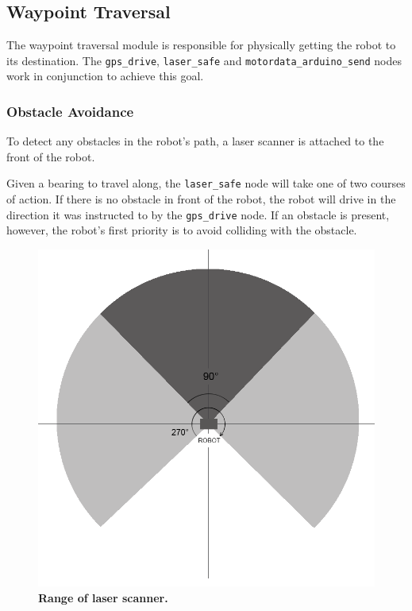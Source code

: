 \documentclass[titlepage,12pt,a4paper]{article}
\begin{document}
\pagebreak

\subsection{Waypoint Traversal}
The waypoint traversal module is responsible for physically getting the robot to its destination. The \verb|gps_drive|, \verb|laser_safe| and \verb|motordata_arduino_send| nodes work in conjunction to achieve this goal.

\subsubsection{Obstacle Avoidance}
To detect any obstacles in the robot's path, a laser scanner is attached to the front of the robot.

Given a bearing to travel along, the \verb|laser_safe| node will take one of two courses of action. If there is no obstacle in front of the robot, the robot will drive in the direction it was instructed to by the \verb|gps_drive| node. If an obstacle is present, however, the robot's first priority is to avoid colliding with the obstacle. 

\begin{figure}[h]
	\centering
	\includegraphics[scale=0.34]{laser.png}
	\caption{\textbf{Range of laser scanner.}}
\end{figure}
\end{document}
